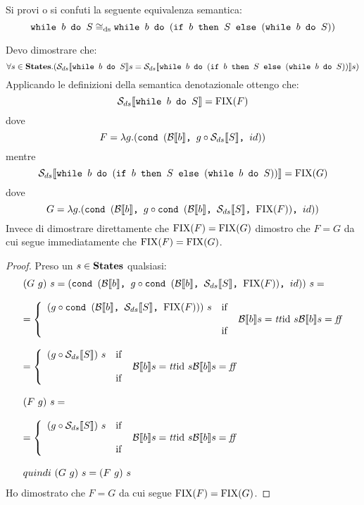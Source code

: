 {
  Si provi o si confuti la seguente equivalenza semantica:
$$
\wbS{b}{S} \eqDS \wbS{b}{(\ifABC{b}{S}{(\wbS{b}{S})})}
$$
}
{
Devo dimostrare che:
$$
\forall s \in \states.(\dsCtxt{\wbS{b}{S}} s = \dsCtxt{\wbS{b}{(\ifABC{b}{S}{(\wbS{b}{S})})}} s)
$$	
Applicando le definizioni della semantica denotazionale ottengo che:
$$
\dsCtxt{\wbS{b}{S}} = \fixp{F}
$$
dove 
$$
F = \lambda g. (\cond{b}{g \circ \dsCtxt{S}}{id})
$$
mentre
$$
\dsCtxt{\wbS{b}{(\ifABC{b}{S}{(\wbS{b}{S})})}} = \fixp{G}
$$
dove
$$
G = \lambda g .(\cond{b}{g \circ \cond{b}{\dsCtxt{S}}{\fixp{F}}}{id})
$$
Invece di dimostrare direttamente che $\fixp{F} = \fixp{G}$ dimostro 
che $F = G$ da cui segue immediatamente che $\fixp{F} = \fixp{G}$.

\begin{proof}
Preso un $s \in \states$ qualsiasi:
$$
\begin{array}{l}
(G\ g)\ s =
(\cond{b}{g \circ \cond{b}{\dsCtxt{S}}{\fixp{F}}}{id})\ s =\\
\\
= \caseFun{(g \circ \cond{b}{\dsCtxt{S}}{\fixp{F}})\ s}
          {\B{b} =\semtrue}
          {\idDS\ s}
          {\B{b} = \semfalse} \\
\\
= \caseFun{(g \circ \dsCtxt{S})\ s}
          {\B{b} = \semtrue}
          {\idDS\ s}
          {\B{b} = \semfalse} \\
\\ 
(F\ g)\ s = \\
\\
= \caseFun{(g \circ \dsCtxt{S})\ s}
          {\B{b} = \semtrue}
          {\idDS\ s}
          {\B{b} = \semfalse} \\
\\
quindi\ (G\ g)\ s = (F\ g)\ s
\end{array}
$$ 
Ho dimostrato che $F = G$ da cui segue $\fixp{F} = \fixp{G}$.
\end{proof}
	
}
